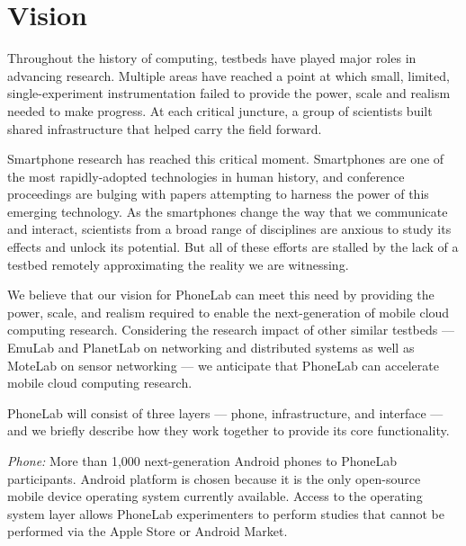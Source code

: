 \section{Vision}
Throughout the history of computing, testbeds have played major roles in
advancing research. Multiple areas have reached a point at which small,
limited, single-experiment instrumentation failed to provide the power, scale
and realism needed to make progress. At each critical juncture, a group of
scientists built shared infrastructure that helped carry the field forward.

Smartphone research has reached this critical moment. Smartphones are one of the
most rapidly-adopted technologies in human history, and conference proceedings
are bulging with papers attempting to harness the power of this emerging
technology. As the smartphones change the way that we communicate and interact,
scientists from a broad range of disciplines are anxious to study its effects
and unlock its potential. But all of these efforts are stalled by the lack of
a testbed remotely approximating the reality we are witnessing.


We believe that our vision for PhoneLab can meet this need by providing the
power, scale, and realism required to enable the next-generation of mobile
cloud computing research. Considering the research impact of other similar
testbeds --- EmuLab and PlanetLab on networking and distributed systems as
well as MoteLab on sensor networking --- we anticipate that PhoneLab can
accelerate mobile cloud computing research.

PhoneLab will consist of three layers --- phone, infrastructure, and
interface --- and we briefly describe how they work together to provide its
core functionality.

\emph{Phone:} More than 1,000 next-generation Android
phones to PhoneLab participants. Android platform is chosen
because it is the only open-source mobile device operating system
currently available.  Access to the operating system layer allows
PhoneLab experimenters to perform studies that cannot be performed via
the Apple Store or Android Market.

